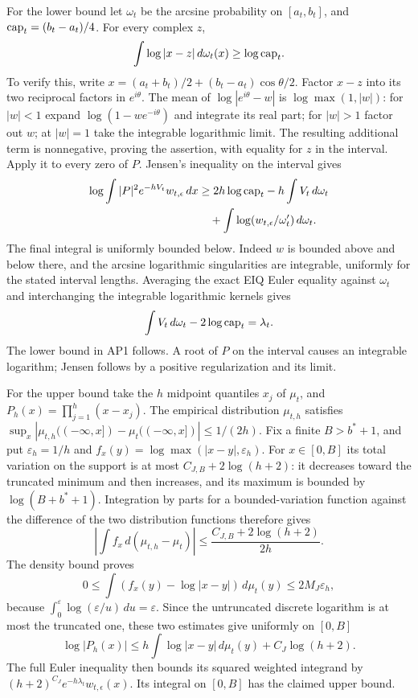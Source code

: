 \documentclass[11pt]{article}
\begin{document}
For the lower bound let \(\omega_t\) be the arcsine probability on
\([a_t,b_t]\), and \({\rm cap}_t=(b_t-a_t)/4\).
For every complex \(z\),
\[
\int\log|x-z|\,d\omega_t(x)\ge\log{\rm cap}_t .
\]
To verify this, write \(x=(a_t+b_t)/2+(b_t-a_t)\cos\theta/2\).
Factor \(x-z\) into its two reciprocal factors in \(e^{i\theta}\).
The mean of \(\log|e^{i\theta}-w|\) is
\(\log\max(1,|w|)\): for \(|w|<1\) expand
\(\log(1-we^{-i\theta})\) and integrate its real part; for
\(|w|>1\) factor out \(w\); at \(|w|=1\) take the integrable
logarithmic limit. The resulting additional term is nonnegative,
proving the assertion, with equality for \(z\) in the interval.
Apply it to every zero of \(P\).
Jensen's inequality on the interval gives
\[
\begin{split}
\log\int |P|^2e^{-hV_t}w_{t,\epsilon}\,dx
&\ge 2h\log{\rm cap}_t-h\int V_t\,d\omega_t\\
&\quad+\int\log(w_{t,\epsilon}/\omega_t')\,d\omega_t .
\end{split}
\]
The final integral is uniformly bounded below. Indeed \(w\) is
bounded above and below there, and the arcsine logarithmic
singularities are integrable, uniformly for the stated interval
lengths. Averaging the exact EIQ Euler equality against \(\omega_t\)
and interchanging the integrable logarithmic kernels gives
\[
\int V_t\,d\omega_t-2\log{\rm cap}_t=\lambda_t.
\]
The lower bound in AP1 follows. A root of \(P\) on the interval
causes an integrable logarithm; Jensen follows by a positive
regularization and its limit.

For the upper bound take the \(h\) midpoint quantiles \(x_j\) of
\(\mu_t\), and \(P_h(x)=\prod_{j=1}^h(x-x_j)\).
The empirical distribution \(\mu_{t,h}\) satisfies
\(\sup_x|\mu_{t,h}((-\infty,x])-\mu_t((-\infty,x])|
\le1/(2h)\). Fix a finite \(B>b^*+1\), and put
\(\varepsilon_h=1/h\) and
\(f_x(y)=\log\max(|x-y|,\varepsilon_h)\).
For \(x\in[0,B]\) its total variation on the support is at most
\(C_{J,B}+2\log(h+2)\): it decreases toward the truncated
minimum and then increases, and its maximum is bounded by
\(\log(B+b^*+1)\).
Integration by parts for a bounded-variation function against the
difference of the two distribution functions therefore gives
\[
\left|\int f_x\,d(\mu_{t,h}-\mu_t)\right|
\le\frac{C_{J,B}+2\log(h+2)}{2h}.
\]
The density bound proves
\[
0\le\int(f_x(y)-\log|x-y|)\,d\mu_t(y)
\le 2M_J\varepsilon_h,
\]
because \(\int_0^\varepsilon\log(\varepsilon/u)\,du=\varepsilon\).
Since the untruncated discrete logarithm is at most the truncated
one, these two estimates give uniformly on \([0,B]\)
\[
\log|P_h(x)|
\le h\int\log|x-y|\,d\mu_t(y)+C_J\log(h+2).
\]
The full Euler inequality then bounds its squared weighted
integrand by
\((h+2)^{C_J}e^{-h\lambda_t}w_{t,\epsilon}(x)\).
Its integral on \([0,B]\) has the claimed upper bound.
\end{document}
